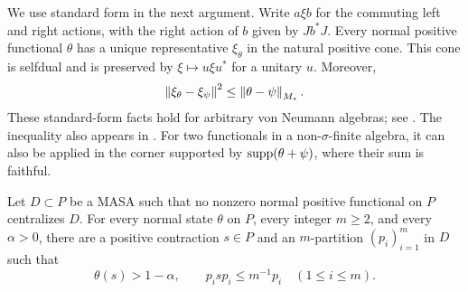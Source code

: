 We use standard form in the next argument. Write $a\xi b$ for the
commuting left and right actions, with the right action of $b$ given
by $Jb^*J$. Every normal positive functional $\theta$ has a unique
representative $\xi_\theta$ in the natural positive cone. This cone
is selfdual and is preserved by $\xi\mapsto u\xi u^*$ for a unitary
$u$. Moreover,
\begin{equation}\label{gen:powers-stormer}
 \left\lVert\xi_\theta-\xi_\psi\right\rVert^{2}
 \leq\left\lVert\theta-\psi\right\rVert_{M_*}.
\end{equation}
These standard-form facts hold for arbitrary von Neumann algebras;
see \cite[Theorem~3.12]{Hiai20}. The inequality also appears in
\cite[Theorem~4(8), Equation~(5.10)]{Araki74}. For two functionals in
a non-$\sigma$-finite algebra, it can also be applied in the corner
supported by $\operatorname{supp}(\theta+\psi)$, where their sum is faithful.

\begin{lemma}\label{lem:no-central-functional}
Let $D\subset P$ be a MASA such that no nonzero normal positive
functional on $P$ centralizes $D$. For every normal state $\theta$ on
$P$, every integer $m\geq2$, and every $\alpha>0$, there are a positive
contraction $s\in P$ and an $m$-partition $(p_i)_{i=1}^m$ in $D$ such
that
\begin{equation}\label{gen:small-diagonal}
 \theta(s)>1-\alpha,\qquad p_i s p_i\leq m^{-1}p_i
 \quad(1\leq i\leq m).
\end{equation}
\end{lemma}

